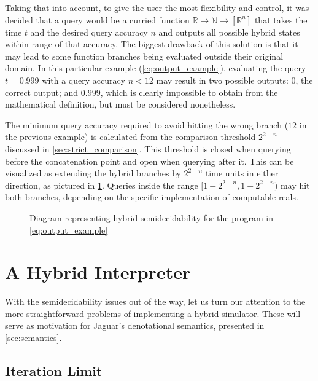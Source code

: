 Taking that into account, to give the user the most flexibility and control, it was decided that a query would be a curried function $\mathbb{R} \rightarrow \mathbb{N} \rightarrow [\mathbb{R}^n]$ that takes the time $t$ and the desired query accuracy $n$ and outputs all possible hybrid states within range of that accuracy. The biggest drawback of this solution is that it may lead to some function branches being evaluated outside their original domain. In this particular example (\cref{eq:output_example}), evaluating the query $t=0.999$ with a query accuracy $n < 12$ may result in two possible outputs: $0$, the correct output; and $0.999$, which is clearly impossible to obtain from the mathematical definition, but must be considered nonetheless.

The minimum query accuracy required to avoid hitting the wrong branch ($12$ in the previous example) is calculated from the comparison threshold $2^{2-n}$ discussed in \cref{sec:strict_comparison}. This threshold is closed when querying before the concatenation point and open when querying after it. This can be visualized as extending the hybrid branches by $2^{2-n}$ time units in either direction, as pictured in \cref{fig:hybrid_branches_example}. Queries inside the range $[1-2^{2-n}, 1+2^{2-n})$ may hit both branches, depending on the specific implementation of computable reals.

\begin{figure}
  \centering
  
  \caption{Diagram representing hybrid semidecidability for the program in \cref{eq:output_example}}
  \label{fig:hybrid_branches_example}
\end{figure}


\section{A Hybrid Interpreter}
\label{sec:interpreter}

With the semidecidability issues out of the way, let us turn our attention to the more straightforward problems of implementing a hybrid simulator. These will serve as motivation for Jaguar's denotational semantics, presented in \cref{sec:semantics}.

\subsection{Iteration Limit}
\label{sec:iteration_limit}

